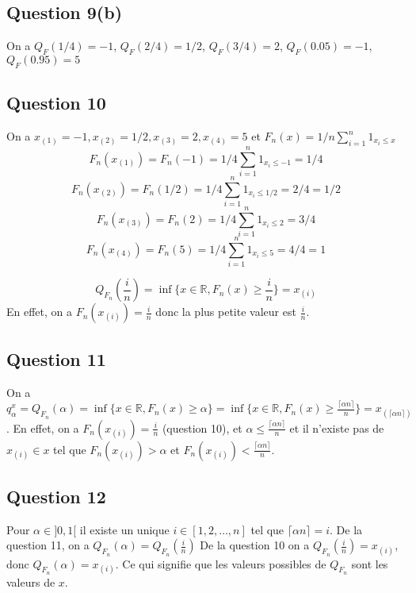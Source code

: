 \documentclass[]{book}
\theoremstyle{definition}
\newcommand{\bb}[1]{\mathbb{#1}}
\newcommand{\R}{\bb{R}}
\begin{document}
\subsection*{Question 9(b)}
On a $Q_F(1/4) = -1$, $Q_F(2/4) = 1/2$, $Q_F(3/4) = 2$, $Q_F(0.05) = -1$, $Q_F(0.95) = 5$ 

\subsection*{Question 10}
On a $x_{(1)} = -1, x_{(2)} = 1/2, x_{(3)} = 2, x_{(4)} = 5$ et $F_n(x) = 1/n \sum_{i=1}^{n}1_{x_i \leq x}$
$$F_n(x_{(1)}) = F_n(-1) = 1/4 \sum_{i=1}^{n}1_{x_i \leq -1} = 1/4$$
$$F_n(x_{(2)}) = F_n(1/2) = 1/4 \sum_{i=1}^{n}1_{x_i \leq 1/2} = 2/4 = 1/2$$
$$F_n(x_{(3)}) = F_n(2) = 1/4 \sum_{i=1}^{n}1_{x_i \leq 2} = 3/4$$
$$F_n(x_{(4)}) = F_n(5) = 1/4 \sum_{i=1}^{n}1_{x_i \leq 5} = 4/4 = 1$$

$$Q_{F_{n}}(\frac{i}{n}) = \inf\{ x \in \R, F_n(x) \geq \frac{i}{n}\} = x_{(i)}$$
En effet, on a $F_n(x_{(i)}) = \frac{i}{n}$ donc la plus petite valeur est $\frac{i}{n}$.

\subsection*{Question 11}
On a $q_{\alpha}^{x} = Q_{F_{n}}(\alpha) = \inf \{ x \in \R, F_n(x) \geq \alpha \} = \inf\{ x \in \R, F_n(x) \geq \frac{\lceil \alpha n \rceil}{n}\} = x_{(\lceil \alpha n \rceil)}$. En effet, on a $F_n(x_{(i)}) = \frac{i}{n}$ (question 10), et $\alpha \leq \frac{\lceil \alpha n \rceil}{n}$ et il n'existe pas de $x_{(i)} \in x$ tel que $F_n(x_{(i)}) > \alpha $ et $F_n(x_{(i)}) < \frac{\lceil \alpha n \rceil}{n}$.


\subsection*{Question 12}
Pour $\alpha \in ]0,1[$ il existe un unique $i \in [1,2,\ldots,n]$ tel que $\lceil \alpha n \rceil = i$. De la question 11, on a $Q_{F_{n}}(\alpha) = Q_{F_{n}}(\frac{i}{n})$ De la question 10 on a $ Q_{F_{n}}(\frac{i}{n}) = x_{(i)}$, donc  $Q_{F_{n}}(\alpha) = x_{(i)}$. Ce qui signifie que les valeurs possibles de $Q_{F_{n}}$ sont les valeurs de $x$.
\end{document}
